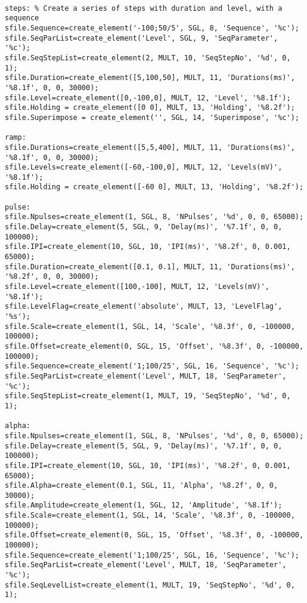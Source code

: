 \documentclass[11pt, letterpaper, titlepage]{paper}
\begin{document}
\begin{verbatim}

steps: % Create a series of steps with duration and level, with a sequence
sfile.Sequence=create_element('-100;50/5', SGL, 8, 'Sequence', '%c');
sfile.SeqParList=create_element('Level', SGL, 9, 'SeqParameter', '%c');
sfile.SeqStepList=create_element(2, MULT, 10, 'SeqStepNo', '%d', 0, 1);
sfile.Duration=create_element([5,100,50], MULT, 11, 'Durations(ms)', '%8.1f', 0, 0, 30000);
sfile.Level=create_element([0,-100,0], MULT, 12, 'Level', '%8.1f');
sfile.Holding = create_element([0 0], MULT, 13, 'Holding', '%8.2f');
sfile.Superimpose = create_element('', SGL, 14, 'Superimpose', '%c');
   
ramp:
sfile.Durations=create_element([5,5,400], MULT, 11, 'Durations(ms)', '%8.1f', 0, 0, 30000);
sfile.Levels=create_element([-60,-100,0], MULT, 12, 'Levels(mV)', '%8.1f');
sfile.Holding = create_element([-60 0], MULT, 13, 'Holding', '%8.2f');
   
pulse:
sfile.Npulses=create_element(1, SGL, 8, 'NPulses', '%d', 0, 0, 65000);
sfile.Delay=create_element(5, SGL, 9, 'Delay(ms)', '%7.1f', 0, 0, 100000);
sfile.IPI=create_element(10, SGL, 10, 'IPI(ms)', '%8.2f', 0, 0.001, 65000);
sfile.Duration=create_element([0.1, 0.1], MULT, 11, 'Durations(ms)', '%8.2f', 0, 0, 30000);
sfile.Level=create_element([100,-100], MULT, 12, 'Levels(mV)', '%8.1f'); 
sfile.LevelFlag=create_element('absolute', MULT, 13, 'LevelFlag', '%s');
sfile.Scale=create_element(1, SGL, 14, 'Scale', '%8.3f', 0, -100000, 100000);
sfile.Offset=create_element(0, SGL, 15, 'Offset', '%8.3f', 0, -100000, 100000);
sfile.Sequence=create_element('1;100/25', SGL, 16, 'Sequence', '%c');
sfile.SeqParList=create_element('Level', MULT, 18, 'SeqParameter', '%c');
sfile.SeqStepList=create_element(1, MULT, 19, 'SeqStepNo', '%d', 0, 1);
   
alpha:
sfile.Npulses=create_element(1, SGL, 8, 'NPulses', '%d', 0, 0, 65000);
sfile.Delay=create_element(5, SGL, 9, 'Delay(ms)', '%7.1f', 0, 0, 100000);
sfile.IPI=create_element(10, SGL, 10, 'IPI(ms)', '%8.2f', 0, 0.001, 65000);
sfile.Alpha=create_element(0.1, SGL, 11, 'Alpha', '%8.2f', 0, 0, 30000);
sfile.Amplitude=create_element(1, SGL, 12, 'Amplitude', '%8.1f');
sfile.Scale=create_element(1, SGL, 14, 'Scale', '%8.3f', 0, -100000, 100000);
sfile.Offset=create_element(0, SGL, 15, 'Offset', '%8.3f', 0, -100000, 100000);
sfile.Sequence=create_element('1;100/25', SGL, 16, 'Sequence', '%c');
sfile.SeqParList=create_element('Level', MULT, 18, 'SeqParameter', '%c');
sfile.SeqLevelList=create_element(1, MULT, 19, 'SeqStepNo', '%d', 0, 1);
\end{verbatim}
\end{document}
